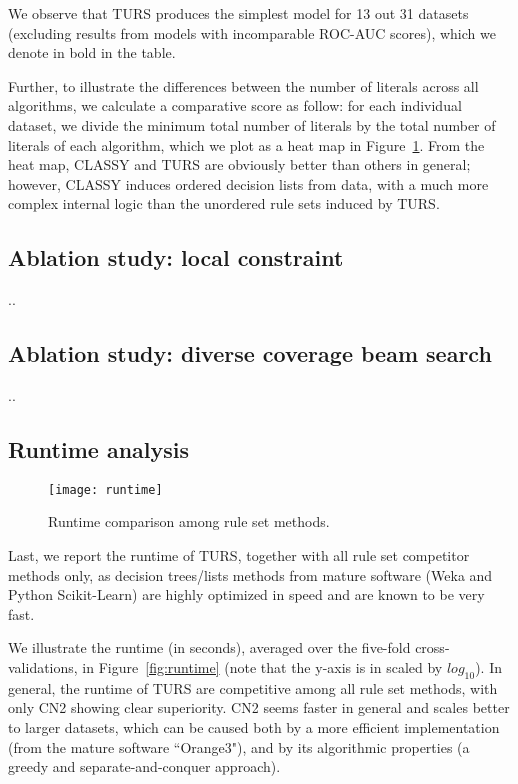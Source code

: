 We observe that TURS produces the simplest model for 13 out 31 datasets (excluding results from models with incomparable ROC-AUC scores), which we denote in bold in the table. 

Further, to illustrate the differences between the number of literals across all algorithms, we calculate a comparative score as follow: for each individual dataset, we divide the minimum total number of literals by the total number of literals of each algorithm, which we plot as a heat map in Figure~\ref{fig:heatmap_modelcomplexity}. From the heat map, CLASSY and TURS are obviously better than others in general; however, CLASSY induces ordered decision lists from data, with a much more complex internal logic than the unordered rule sets induced by TURS. 


\subsection{Ablation study: local constraint}
..
\subsection{Ablation study: diverse coverage beam search}
..
\subsection{Runtime analysis}
\begin{figure}[ht] \label{fig:runtime}
	\texttt{[image: runtime]}
	\caption{Runtime comparison among rule set methods.}	 
	\label{fig:heatmap_modelcomplexity}
\end{figure}
Last, we report the runtime of TURS, together with all rule set competitor methods only, as decision trees/lists methods from mature software (Weka and Python Scikit-Learn) are highly optimized in speed and are known to be very fast. 

We illustrate the runtime (in seconds), averaged over the five-fold cross-validations, in Figure~\ref{fig:runtime} (note that the y-axis is in scaled by $log_{10}$). In general, the runtime of TURS are competitive among all rule set methods, with only CN2 showing clear superiority. CN2 seems faster in general and scales better to larger datasets, which can be caused both by a more efficient implementation (from the mature software ``Orange3"), and by its algorithmic properties (a greedy and separate-and-conquer approach). 

